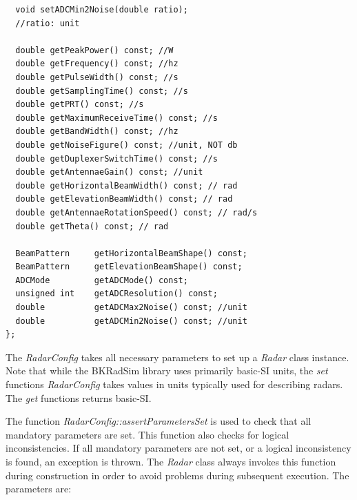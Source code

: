 \documentclass[letterpaper]{book}
\begin{document}
\begin{lstlisting}
  void setADCMin2Noise(double ratio);
  //ratio: unit

  double getPeakPower() const; //W
  double getFrequency() const; //hz
  double getPulseWidth() const; //s
  double getSamplingTime() const; //s
  double getPRT() const; //s
  double getMaximumReceiveTime() const; //s
  double getBandWidth() const; //hz
  double getNoiseFigure() const; //unit, NOT db
  double getDuplexerSwitchTime() const; //s
  double getAntennaeGain() const; //unit
  double getHorizontalBeamWidth() const; // rad
  double getElevationBeamWidth() const; // rad
  double getAntennaeRotationSpeed() const; // rad/s
  double getTheta() const; // rad

  BeamPattern     getHorizontalBeamShape() const;
  BeamPattern     getElevationBeamShape() const;
  ADCMode         getADCMode() const;
  unsigned int    getADCResolution() const;
  double          getADCMax2Noise() const; //unit
  double          getADCMin2Noise() const; //unit  
};
\end{lstlisting}
The \textit{RadarConfig} takes all necessary parameters to set up a \textit{Radar} class instance. Note that while the BKRadSim library uses primarily basic-SI units, the \textit{set} functions \textit{RadarConfig} takes values in units typically used for describing radars. The \textit{get} functions returns basic-SI. 

The function \textit{RadarConfig::assertParametersSet} is used to check that all mandatory parameters are set. This function also checks for logical inconsistencies. If all mandatory parameters are not set, or a logical inconsistency is found, an exception is thrown. The \textit{Radar} class always invokes this function during construction in order to avoid problems during subsequent execution. The parameters are:
\end{document}
